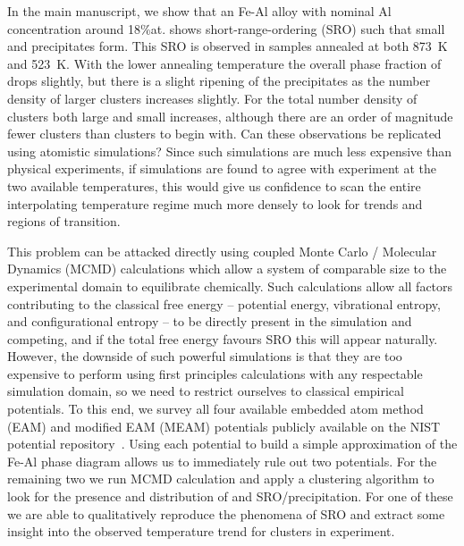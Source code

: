 In the main manuscript, we show that an Fe-Al alloy with nominal Al concentration around 18\%at. shows short-range-ordering (SRO) such that small \DOTHREE and \BTWO precipitates form.
This SRO is observed in samples annealed at both 873~K and 523~K.
With the lower annealing temperature the overall phase fraction of \DOTHREE drops slightly, but there is a slight ripening of the precipitates as the number density of larger clusters increases slightly.
For \BTWO the total number density of clusters both large and small increases, although there are an order of magnitude fewer \BTWO clusters than \DOTHREE clusters to begin with.
Can these observations be replicated using atomistic simulations?
Since such simulations are much less expensive than physical experiments, if simulations are found to agree with experiment at the two available temperatures, this would give us confidence to scan the entire interpolating temperature regime much more densely to look for trends and regions of transition.

This problem can be attacked directly using coupled Monte Carlo / Molecular Dynamics (MCMD) calculations which allow a system of comparable size to the experimental domain to equilibrate chemically.
Such calculations allow all factors contributing to the classical free energy -- potential energy, vibrational entropy, and configurational entropy -- to be directly present in the simulation and competing, and if the total free energy favours SRO this will appear naturally.
However, the downside of such powerful simulations is that they are too expensive to perform using first principles calculations with any respectable simulation domain, so we need to restrict ourselves to classical empirical potentials.
To this end, we survey all four available embedded atom method (EAM) and modified EAM (MEAM) potentials publicly available on the NIST potential repository~\cite{nist}.
Using each potential to build a simple approximation of the Fe-Al phase diagram allows us to immediately rule out two potentials.
For the remaining two we run MCMD calculation and apply a clustering algorithm to look for the presence and distribution of \DOTHREE and \BTWO SRO/precipitation.
For one of these we are able to qualitatively reproduce the phenomena of SRO and extract some insight into the observed temperature trend for \DOTHREE clusters in experiment.
